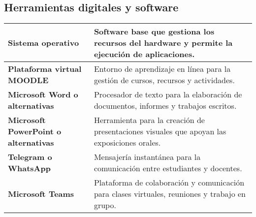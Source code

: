 \subsection*{Herramientas digitales y software}

\begin{xltabular}{\linewidth}{@{}>{\bfseries}X X@{}}
    \toprule
    Sistema operativo & Software base que gestiona los recursos del hardware y permite la ejecución de aplicaciones. \\
    \midrule
    Plataforma virtual MOODLE & Entorno de aprendizaje en línea para la gestión de cursos, recursos y actividades. \\
    \midrule
    Microsoft Word o alternativas & Procesador de texto para la elaboración de documentos, informes y trabajos escritos. \\
    \midrule
    Microsoft PowerPoint o alternativas & Herramienta para la creación de presentaciones visuales que apoyan las exposiciones orales. \\
    \midrule
    Telegram o WhatsApp & Mensajería instantánea para la comunicación entre estudiantes y docentes. \\
    \midrule
    Microsoft Teams & Plataforma de colaboración y comunicación para clases virtuales, reuniones y trabajo en grupo. \\
    \bottomrule
\end{xltabular}
\pagebreak